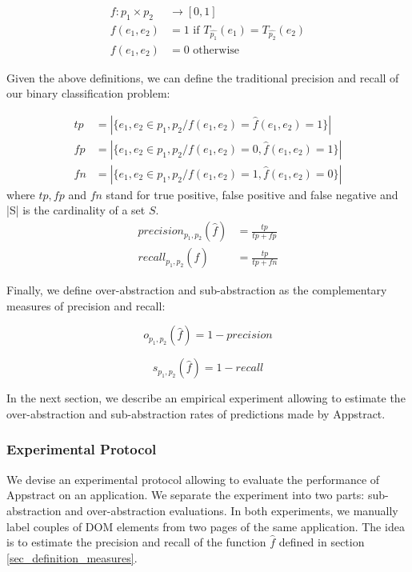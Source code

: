 \begin{defn}
\begin{align}
f:  p_1 \times p_2 & \to [0, 1] \\
f(e_1, e_2) &= 1  \text{ if $T_{\hat{p_1}}(e_1) =  T_{\hat{p_2}}(e_2)$}\\
f(e_1, e_2) &= 0 \text{ otherwise}
\end{align}
\end{defn}
Given the above definitions, we can define the traditional precision and recall of our binary classification problem:
\begin{defn}
\begin{align}
tp &=|\{e_1, e_2 \in p_1, p_2 / f(e_1, e_2) = \hat{f}(e_1, e_2) = 1\}| \\
fp &=|\{e_1, e_2 \in p_1, p_2 / f(e_1, e_2) = 0, \hat{f}(e_1, e_2) = 1\}| \\
fn &=|\{e_1, e_2 \in p_1, p_2 / f(e_1, e_2) = 1, \hat{f}(e_1, e_2) = 0\}| 
\end{align}
where $tp, fp$ and $fn$ stand for true positive, false positive and false negative and |S| is the cardinality of a set $S$.
\begin{align}
precision_{p_1, p_2}(\hat{f}) &= \frac{tp}{tp + fp} \\
recall_{p_1, p_2}(\hat{f})  &= \frac{tp}{tp + fn}
\end{align}
\end{defn}

Finally, we define over-abstraction and sub-abstraction as the complementary measures of precision and recall:
\begin{defn}
\begin{equation}
o_{p_1, p_2}(\hat{f})  = 1 - precision
\end{equation}
\end{defn}
\begin{defn}
\begin{equation}
s_{p_1, p_2}(\hat{f})  = 1 - recall
\end{equation}
\end{defn}

In the next section, we describe an empirical experiment allowing to estimate the over-abstraction and sub-abstraction rates of predictions made by Appstract. 

\subsubsection{Experimental Protocol}
We devise an experimental protocol allowing to evaluate the performance of Appstract on an application.
We separate the experiment into two parts: sub-abstraction and over-abstraction evaluations.
In both experiments, we manually label couples of DOM elements from two pages of the same application.
The idea is to estimate the precision and recall of the function $\hat{f}$ defined in section \ref{sec_definition_measures}.

